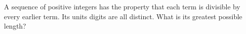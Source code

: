 A sequence of positive integers has the property that each term is divisible by every earlier term. Its units digits are all distinct. What is its greatest possible length?

